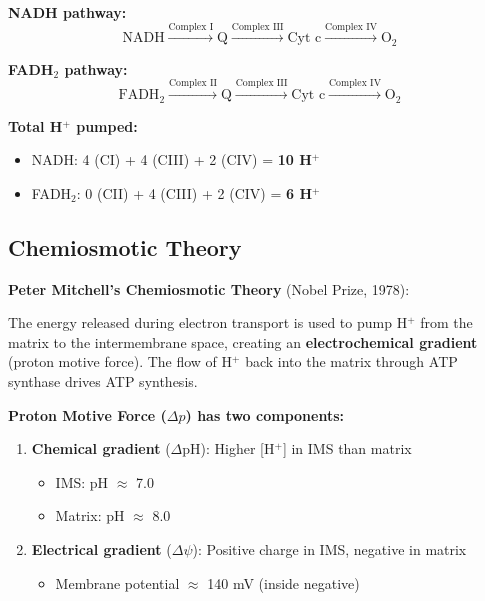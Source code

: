\begin{tcolorbox}[colback=yellow!10, colframe=yellow!70!black, title=\textbf{Summary: Electron Flow Through ETC}]
\begin{center}
\textbf{NADH pathway:}
\[
\text{NADH} \xrightarrow{\text{Complex I}} \text{Q} \xrightarrow{\text{Complex III}} \text{Cyt c} \xrightarrow{\text{Complex IV}} \text{O}_2
\]

\textbf{FADH$_2$ pathway:}
\[
\text{FADH}_2 \xrightarrow{\text{Complex II}} \text{Q} \xrightarrow{\text{Complex III}} \text{Cyt c} \xrightarrow{\text{Complex IV}} \text{O}_2
\]
\end{center}

\textbf{Total H$^+$ pumped:}
\begin{itemize}
    \item NADH: 4 (CI) + 4 (CIII) + 2 (CIV) = \textbf{10 H$^+$}
    \item FADH$_2$: 0 (CII) + 4 (CIII) + 2 (CIV) = \textbf{6 H$^+$}
\end{itemize}
\end{tcolorbox}

\subsection{Chemiosmotic Theory}

\begin{theorem}
\textbf{Peter Mitchell's Chemiosmotic Theory} (Nobel Prize, 1978):

The energy released during electron transport is used to pump H$^+$ from the matrix to the intermembrane space, creating an \textbf{electrochemical gradient} (proton motive force). The flow of H$^+$ back into the matrix through ATP synthase drives ATP synthesis.
\end{theorem}

\textbf{Proton Motive Force ($\Delta p$) has two components:}

\begin{enumerate}
    \item \textbf{Chemical gradient} ($\Delta$pH): Higher [H$^+$] in IMS than matrix
    \begin{itemize}
        \item IMS: pH $\approx$ 7.0
        \item Matrix: pH $\approx$ 8.0
    \end{itemize}
    
    \item \textbf{Electrical gradient} ($\Delta\psi$): Positive charge in IMS, negative in matrix
    \begin{itemize}
        \item Membrane potential $\approx$ 140 mV (inside negative)
    \end{itemize}
\end{enumerate}

